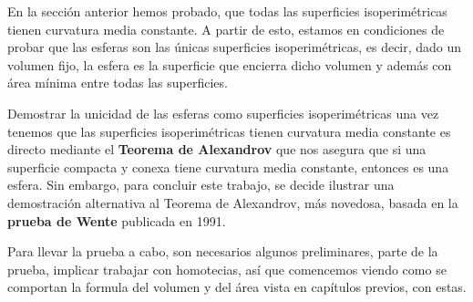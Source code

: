 En la sección anterior hemos probado, que todas las superficies isoperimétricas tienen curvatura media constante. A partir de esto, estamos en condiciones de probar que las esferas son las únicas superficies isoperimétricas, es decir, dado un volumen fijo, la esfera es la superficie que encierra dicho volumen y además con área mínima entre todas las superficies.

Demostrar la unicidad de las esferas como superficies isoperimétricas una vez tenemos que las superficies isoperimétricas tienen curvatura media constante es directo mediante el \textbf{Teorema de Alexandrov} que nos asegura que si una superficie compacta y conexa tiene curvatura media constante, entonces es una esfera. Sin embargo, para concluir este trabajo, se decide ilustrar una demostración alternativa al Teorema de Alexandrov, más novedosa, basada en la \textbf{prueba de Wente} \cite{wenteproof} publicada en 1991.

Para llevar la prueba a cabo, son necesarios algunos preliminares, parte de la prueba, implicar trabajar con homotecias, así que comencemos viendo como se comportan la formula del volumen y del área vista en capítulos previos, con estas.

